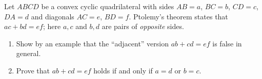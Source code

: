 Let $ABCD$ be a convex cyclic quadrilateral with sides $AB=a$, $BC=b$, $CD=c$, $DA=d$ and diagonals $AC=e$, $BD=f$. Ptolemy's theorem states that $ac+bd=ef$; here $a,c$ and $b,d$ are pairs of \emph{opposite} sides.
\begin{enumerate}
\item[(a)] Show by an example that the ``adjacent'' version $ab+cd=ef$ is false in general.
\item[(b)] Prove that $ab+cd=ef$ holds if and only if $a=d$ or $b=c$.
\end{enumerate}
